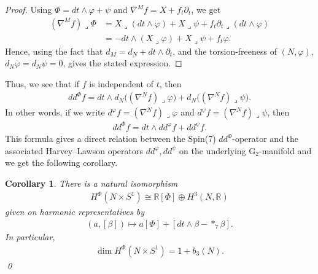 \documentclass[10pt,a4paper,reqno]{article}
\newtheorem{corollary}[theorem]{Corollary}
\theoremstyle{definition}
\numberwithin{equation}{section}
\def\G2{\mathrm{G}_2}
\def\ddphi{dd^{\Phi}}
\begin{document}
\begin{proof}
Using $\Phi=dt\wedge\varphi+\psi$ and $\nabla^Mf=X+f_t\partial_t$, we get
\begin{align*}
(\nabla^Mf)\lrcorner\Phi &= X\lrcorner(dt\wedge\varphi) +X\lrcorner\psi +f_t\partial_t\lrcorner(dt\wedge\varphi)\\
&= -dt\wedge(X\lrcorner\varphi) +X\lrcorner\psi +f_t\varphi.
\end{align*}
Hence, using the fact that $d_M=d_N+dt\wedge\partial_t$, and the torsion-freeness of $(N, \varphi)$, $d_N\varphi=d_N\psi=0$, gives the stated expression. 
\end{proof}

Thus, we see that if $f$ is independent of $t$, then
\begin{align*}
\ddphi f = dt\wedge d_N\bigl((\nabla^Nf)\lrcorner\varphi\bigr)
+ d_N\bigl((\nabla^Nf)\lrcorner\psi\bigr).
\end{align*}
In other words, if we write $d^\varphi f=(\nabla^Nf)\lrcorner\varphi$ and $d^\psi f=(\nabla^Nf)\lrcorner\psi$, then
\begin{align*}
dd^\Phi f=dt\wedge dd^\varphi f+dd^\psi f.
\end{align*}
This formula gives a direct relation between the Spin(7) $\ddphi$-operator and the associated Harvey–Lawson operators $dd^\varphi, dd^\psi$ on the underlying $\G2$-manifold and we get the following corollary.

\begin{corollary}
There is a natural isomorphism
\begin{align*}
H^\Phi(N\times S^1) \cong \mathbb R[\Phi]\oplus H^3(N,\mathbb R)
\end{align*}
given on harmonic representatives by
\begin{align*}
(a,[\beta]) \longmapsto a[\Phi]+[dt\wedge\beta-*_7\beta].
\end{align*}
In particular,
\begin{align*}
\dim H^\Phi(N\times S^1)=1+b_3(N).
\end{align*}
\qed
\end{corollary}
\end{document}
